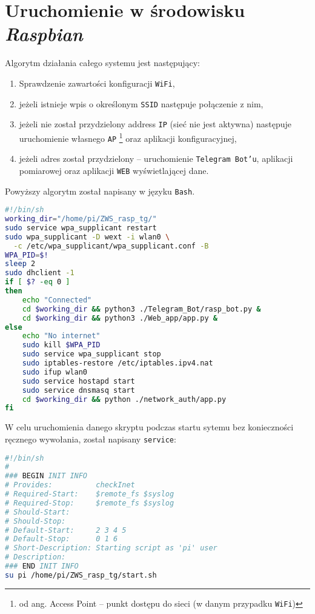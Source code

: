 \section{Uruchomienie w środowisku \textsl{Raspbian}}
Algorytm działania całego systemu jest następujący:
\begin{enumerate}
  \item Sprawdzenie zawartości konfiguracji \texttt{WiFi},
  \item jeżeli istnieje wpis o określonym \texttt{SSID}	
    następuje połączenie z nim,
  \item jeżeli nie został przydzielony address \texttt{IP} (sieć nie jest aktywna)
    następuje uruchomienie własnego \texttt{AP}
    \footnote{od ang. Access Point -- punkt dostępu 
    do sieci (w danym przypadku \texttt{WiFi})} oraz
    aplikacji konfiguracyjnej,
  \item jeżeli adres został przydzielony -- uruchomienie \texttt{Telegram Bot'u},
    aplikacji pomiarowej oraz aplikacji \texttt{WEB} wyświetlającej dane.
\end{enumerate}

Powyższy algorytm został napisany w języku \texttt{Bash}.
\begin{lstlisting}[basicstyle=\ttfamily\small, language=bash, frame=single,
  caption={Uruchomienie procesów w systemie \textsl{Raspbian}}]
#!/bin/sh
working_dir="/home/pi/ZWS_rasp_tg/"
sudo service wpa_supplicant restart
sudo wpa_supplicant -D wext -i wlan0 \
  -c /etc/wpa_supplicant/wpa_supplicant.conf -B
WPA_PID=$!
sleep 2
sudo dhclient -1
if [ $? -eq 0 ]
then
	echo "Connected"
	cd $working_dir && python3 ./Telegram_Bot/rasp_bot.py &
	cd $working_dir && python3 ./Web_app/app.py &
else
	echo "No internet"
	sudo kill $WPA_PID
	sudo service wpa_supplicant stop
	sudo iptables-restore /etc/iptables.ipv4.nat
	sudo ifup wlan0
	sudo service hostapd start
	sudo service dnsmasq start
	cd $working_dir && python ./network_auth/app.py
fi
\end{lstlisting}
W celu uruchomienia danego skryptu podczas startu sytemu bez
konieczności ręcznego wywołania, został napisany \texttt{service}:
\begin{lstlisting}[basicstyle=\ttfamily\small, language=bash, frame=single,
  caption={\texttt{service} wywołujący skrypt}]
#!/bin/sh
#
### BEGIN INIT INFO
# Provides:          checkInet
# Required-Start:    $remote_fs $syslog
# Required-Stop:     $remote_fs $syslog
# Should-Start: 
# Should-Stop:
# Default-Start:     2 3 4 5
# Default-Stop:      0 1 6
# Short-Description: Starting script as 'pi' user 
# Description:
### END INIT INFO
su pi /home/pi/ZWS_rasp_tg/start.sh
\end{lstlisting}
